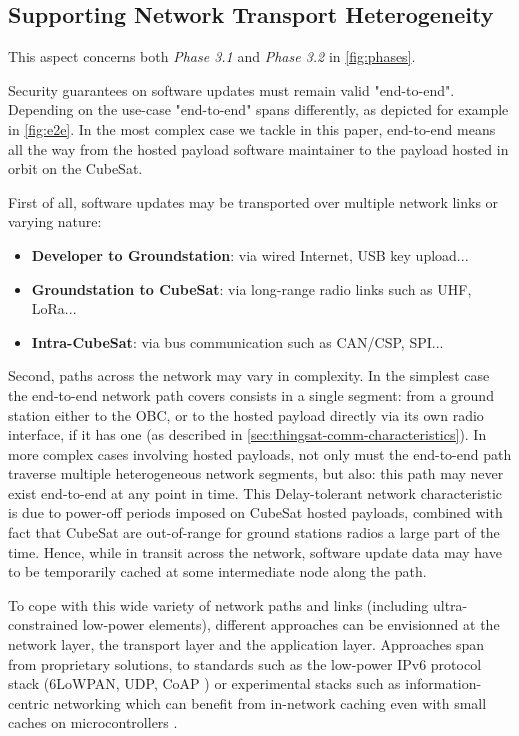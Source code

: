 \subsection{Supporting Network Transport Heterogeneity}
This aspect concerns both \textit{Phase 3.1} and \textit{Phase 3.2} in \autoref{fig:phases}. 

Security guarantees on software updates must remain valid "end-to-end".
Depending on the use-case "end-to-end" spans differently, as depicted for example in \autoref{fig:e2e}. In the most complex case we tackle in this paper, end-to-end means all the way from the hosted payload software maintainer to the payload hosted in orbit on the CubeSat.

First of all, software updates may be transported over multiple network links or varying nature: 
\begin{itemize}
\item {\bf Developer to Groundstation}: via wired Internet, USB key upload...
\item {\bf Groundstation to CubeSat}: via long-range radio links such as UHF, LoRa...
\item {\bf Intra-CubeSat}: via bus communication such as CAN/CSP, SPI...
\end{itemize}

Second, paths across the network may vary in complexity.
In the simplest case the end-to-end network path covers consists in a single segment: from a ground station either to the OBC, or to the hosted payload directly via its own radio interface, if it has one (as described in \autoref{sec:thingsat-comm-characteristics}).
In more complex cases involving hosted payloads, not only
must the end-to-end path traverse multiple heterogeneous network segments,
but also: this path may never exist end-to-end at any point in time.
This Delay-tolerant network characteristic is due to power-off periods imposed on CubeSat hosted payloads, 
combined with fact that CubeSat are out-of-range for ground stations radios a large part of the time.
Hence, while in transit across the network, software update data may have to be temporarily cached at some intermediate node along the path.

To cope with this wide variety of network paths and links (including ultra-constrained low-power elements), different approaches can be envisionned at the network layer, the transport layer and the application layer. Approaches span from proprietary solutions, to standards such as the low-power IPv6 protocol stack (6LoWPAN, UDP, CoAP \cite{morabito2020ietf}) or experimental stacks such as information-centric networking which can benefit from in-network caching even with small caches on microcontrollers \cite{hahm2017low}. 

